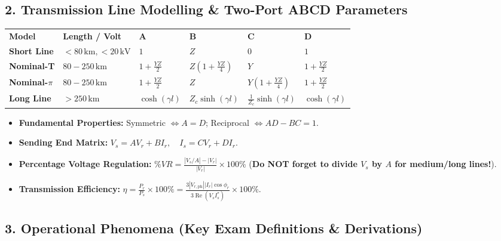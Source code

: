 \documentclass[10pt,a4paper]{article}
\begin{document}
\subsection{2. Transmission Line Modelling \& Two-Port ABCD Parameters}

\begin{center}
\small
\begin{tabularx}{\textwidth}{L{2.2cm} L{2.2cm} C{2.2cm} C{2.5cm} C{2.2cm} C{2.0cm}}
  \color{white}\textbf{Model} & \color{white}\textbf{Length / Volt} & \color{white}\textbf{A} & \color{white}\textbf{B} & \color{white}\textbf{C} & \color{white}\textbf{D} \\
   \textbf{Short Line} & $<80\,\text{km}, <20\,\text{kV}$ & $1$ & $Z$ & $0$ & $1$ \\
  \textbf{Nominal-T} & $80-250\,\text{km}$ & $1 + \frac{YZ}{2}$ & $Z\left(1 + \frac{YZ}{4}\right)$ & $Y$ & $1 + \frac{YZ}{2}$ \\
   \textbf{Nominal-$\pi$} & $80-250\,\text{km}$ & $1 + \frac{YZ}{2}$ & $Z$ & $Y\left(1 + \frac{YZ}{4}\right)$ & $1 + \frac{YZ}{2}$ \\
  \textbf{Long Line} & $>250\,\text{km}$ & $\cosh(\gamma l)$ & $Z_c \sinh(\gamma l)$ & $\frac{1}{Z_c}\sinh(\gamma l)$ & $\cosh(\gamma l)$ \\
\end{tabularx}
\end{center}

\begin{itemize}
  \item \textbf{Fundamental Properties:} Symmetric $\iff A = D$; Reciprocal $\iff AD - BC = 1$.
  \item \textbf{Sending End Matrix:} $V_s = A V_r + B I_r, \quad I_s = C V_r + D I_r$.
  \item \textbf{Percentage Voltage Regulation:} $\%VR = \frac{|V_s / A| - |V_r|}{|V_r|} \times 100\%$ \quad (\textbf{Do NOT forget to divide $V_s$ by $A$ for medium/long lines!}).
  \item \textbf{Transmission Efficiency:} $\eta = \frac{P_r}{P_s} \times 100\% = \frac{3 |V_{r,\text{ph}}| |I_r| \cos\phi_r}{3 \operatorname{Re}(V_s I_s^*)} \times 100\%$.
\end{itemize}

\subsection{3. Operational Phenomena (Key Exam Definitions \& Derivations)}
\end{document}
